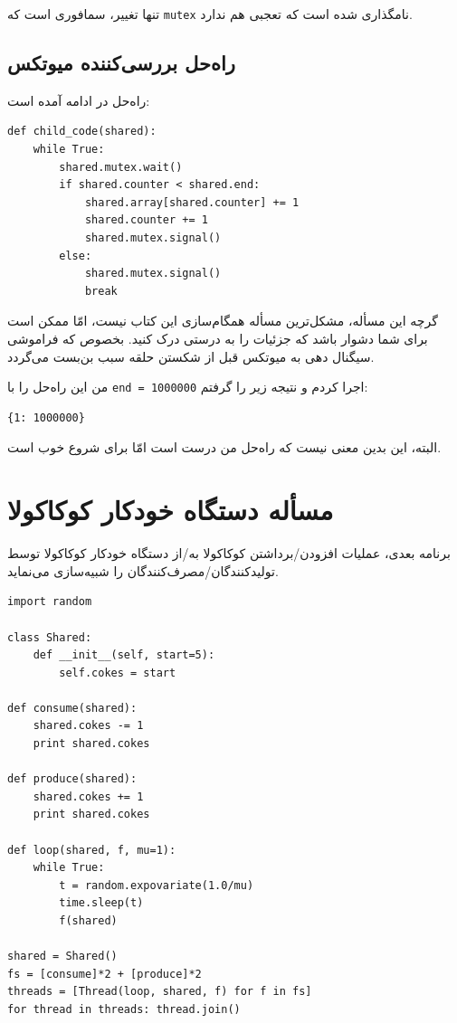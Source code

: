 \documentclass{book}
\newcommand{\clearemptydoublepage}{\newpage\cleardoublepage}
\begin{document}
    تنها تغییر،  سمافوری است که {\tt mutex} نامگذاری شده است که تعجبی هم ندارد. 

\clearemptydoublepage
\subsection{راه‌حل بررسی‌کننده میوتکس}

    راه‌حل در ادامه آمده است:

\begin{latin}
\begin{lstlisting}
def child_code(shared):
    while True:
        shared.mutex.wait()
        if shared.counter < shared.end:
            shared.array[shared.counter] += 1
            shared.counter += 1
            shared.mutex.signal()
        else:
            shared.mutex.signal()
            break
\end{lstlisting}
\end{latin}

    گرچه این مسأله، مشکل‌ترین مسأله همگام‌سازی این کتاب نیست، امّا ممکن است برای شما دشوار باشد که جزئیات را به درستی درک کنید. 
    بخصوص که فراموشی سیگنال دهی به میوتکس قبل از شکستن حلقه سبب بن‌بست می‌گردد. 

    من این راه‌حل را با  {\tt end = 1000000} اجرا کردم و نتیجه زیر را گرفتم: 
\begin{latin}
\begin{verbatim}
{1: 1000000}
\end{verbatim}
\end{latin}

    البته، این بدین معنی نیست که راه‌حل من درست است امّا برای شروع خوب است. 
    

\clearemptydoublepage
\section {مسأله دستگاه خودکار کوکاکولا}

    برنامه بعدی، عملیات افزودن/برداشتن  کوکاکولا به/از دستگاه خودکار کوکاکولا توسط تولیدکنندگان/مصرف‌کنندگان را شبیه‌سازی می‌نماید. 

\begin{latin}
\begin{lstlisting}
import random

class Shared:
    def __init__(self, start=5):
        self.cokes = start

def consume(shared):
    shared.cokes -= 1
    print shared.cokes

def produce(shared):
    shared.cokes += 1
    print shared.cokes

def loop(shared, f, mu=1):
    while True:
        t = random.expovariate(1.0/mu)
        time.sleep(t)
        f(shared)

shared = Shared()
fs = [consume]*2 + [produce]*2 
threads = [Thread(loop, shared, f) for f in fs]
for thread in threads: thread.join()
\end{lstlisting}
\end{latin}
\end{document}
